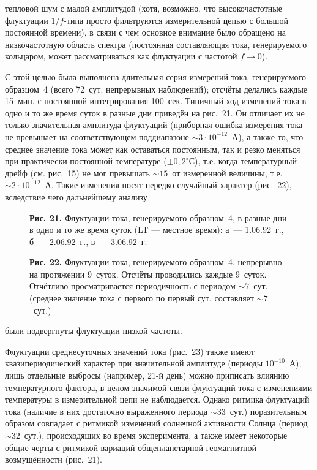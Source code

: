 \documentclass[12pt,a4paper]{article}
\begin{document}
тепловой шум с малой амплитудой (хотя, возможно, что высокочастотные флуктуации
$1/f$-типа просто фильтруются измерительной цепью с большой постоянной
времени), в связи с чем основное внимание было обращено на низкочастотную
область спектра (постоянная составляющая тока, генерируемого кольцаром, может
рассматриваться как флуктуации с частотой $f \to 0$).

С этой целью была выполнена длительная серия измерений тока, генерируемого
образцом~4 (всего 72~сут. непрерывных наблюдений); отсчёты делались каждые
15~мин. с постоянной интегрирования 100~сек. Типичный ход изменений тока в
одно и то же время суток в разные дни приведён на рис.~21. Он отличает их не
только значительная амплитуда флуктуаций (приборная ошибка измерения тока не
превышает на соответствующем поддиапазоне $\sim 3 \cdot 10^{-12}$~А), а также
то, что среднее значение тока может как оставаться постоянным, так и резко
меняться при практически постоянной температуре ($\pm 0{,}2^{\circ}$С), т.е.
когда температурный дрейф (см. рис.~15) не мог превышать $\sim 15$~от
измеренной величины, т.е. $\sim 2 \cdot 10^{-12}$~А. Такие изменения носят
нередко случайный характер (рис.~22), вследствие чего дальнейшему анализу

\begin{figure}[h]
\centering
\caption*{\textbf{Рис. 21.} Флуктуации тока, генерируемого образцом~4, в разные
дни в одно и то же время суток (LT — местное время): а~— 1.06.92~г.,
б~— 2.06.92~г., в~— 3.06.92~г.}
\end{figure}

\begin{figure}[h]
\centering
\caption*{\textbf{Рис. 22.} Флуктуации тока, генерируемого образцом~4,
непрерывно на протяжении 9~суток. Отсчёты проводились каждые 9~суток.
Отчётливо просматривается периодичность с периодом $\sim 7$~сут. (среднее
значение тока с первого по первый сут. составляет $\sim 7$~сут.)}
\end{figure}

\newpage

были подвергнуты флуктуации низкой частоты.

Флуктуации среднесуточных значений тока (рис.~23) также имеют квазипериодический
характер при значительной амплитуде (периоды $10^{-10}$~А); лишь отдельные
выбросы (например, 21-й день) можно приписать влиянию температурного фактора,
в целом значимой связи флуктуаций тока с изменениями температуры в измерительной
цепи не наблюдается. Однако ритмика флуктуаций тока (наличие в них достаточно
выраженного периода $\sim 33$~сут.) поразительным образом совпадает с ритмикой
изменений солнечной активности Солнца (период $\sim 32$~сут.), происходящих во
время эксперимента, а также имеет некоторые общие черты с ритмикой вариаций
общепланетарной геомагнитной возмущённости (рис.~21).
\end{document}
